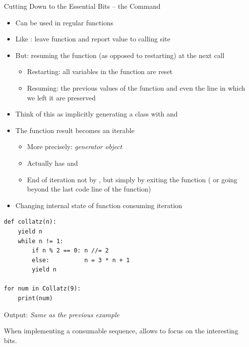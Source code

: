 
\begin{frame}[fragile]{Cutting Down to the Essential Bits -- the Command }
%
\begin{itemize}
\item Can be used in regular functions
\item Like : leave function and report value to calling site
\item But: resuming the function (as opposed to restarting) at the next call
	\begin{itemize}
	\item Restarting: all variables in the function are reset
	\item Resuming: the previous values of the function and even the line in which we left it are preserved
	\end{itemize}
\item Think of this as implicitly generating a class with  and 
\item The function result becomes an iterable
	\begin{itemize}
	\item More precisely: \emph{generator object}
	\item Actually has  and 
	\item End of iteration not by , but simply by exiting the function ( or going beyond the last code line of the function)
	\end{itemize}
\item Changing internal state of function \Thus consuming iteration
\end{itemize}
%
\end{frame}


\begin{frame}[fragile]
%
\begin{codebox}
\begin{verbatim}
def collatz(n):
    yield n
    while n != 1:
        if n % 2 == 0: n //= 2
        else:          n = 3 * n + 1
        yield n

for num in Collatz(9):
    print(num)
\end{verbatim}
\end{codebox}
%
Output: \emph{Same as the previous example}
%
\begin{hintbox}
When implementing a consumable sequence,  allows to focus on the interesting bits.
\end{hintbox}
%
\end{frame}



